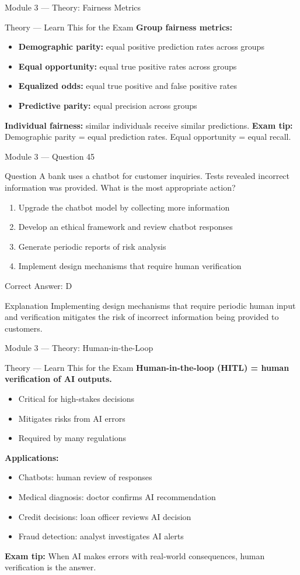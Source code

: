 \documentclass[aspectratio=169,10pt]{beamer}
\newcommand{\question}[1]{%
	\begin{block}{Question}
		#1
	\end{block}
}
\newcommand{\options}[4]{%
	\begin{enumerate}[label=\Alph*.,leftmargin=*]
		\item #1
		\item #2
		\item #3
		\item #4
	\end{enumerate}
}
\newcommand{\answerbox}[1]{%
	\begin{exampleblock}{Correct Answer: #1}
	\end{exampleblock}
}
\newcommand{\explain}[1]{%
	\begin{block}{Explanation}
		\small #1
	\end{block}
}
\newcommand{\theory}[1]{%
	\begin{block}{Theory --- Learn This for the Exam}
		\small #1
	\end{block}
}
\begin{document}
	\begin{frame}{Module 3 --- Theory: Fairness Metrics}
		\theory{
			\textbf{Group fairness metrics:}
			\begin{itemize}
				\item \textbf{Demographic parity:} equal positive prediction rates across groups
				\item \textbf{Equal opportunity:} equal true positive rates across groups
				\item \textbf{Equalized odds:} equal true positive and false positive rates
				\item \textbf{Predictive parity:} equal precision across groups
			\end{itemize}
			\textbf{Individual fairness:} similar individuals receive similar predictions.
			\textbf{Exam tip:} Demographic parity = equal prediction rates. Equal opportunity = equal recall.
		}
	\end{frame}
	
	\begin{frame}{Module 3 --- Question 45}
		\question{A bank uses a chatbot for customer inquiries. Tests revealed incorrect information was provided. What is the most appropriate action?}
		\options{Upgrade the chatbot model by collecting more information}{Develop an ethical framework and review chatbot responses}{Generate periodic reports of risk analysis}{Implement design mechanisms that require human verification}
		\answerbox{D}
		\explain{Implementing design mechanisms that require periodic human input and verification mitigates the risk of incorrect information being provided to customers.}
	\end{frame}
	
	\begin{frame}{Module 3 --- Theory: Human-in-the-Loop}
		\theory{
			\textbf{Human-in-the-loop (HITL) = human verification of AI outputs.}
			\begin{itemize}
				\item Critical for high-stakes decisions
				\item Mitigates risks from AI errors
				\item Required by many regulations
			\end{itemize}
			\textbf{Applications:}
			\begin{itemize}
				\item Chatbots: human review of responses
				\item Medical diagnosis: doctor confirms AI recommendation
				\item Credit decisions: loan officer reviews AI decision
				\item Fraud detection: analyst investigates AI alerts
			\end{itemize}
			\textbf{Exam tip:} When AI makes errors with real-world consequences, human verification is the answer.
		}
	\end{frame}
	
\end{document}
